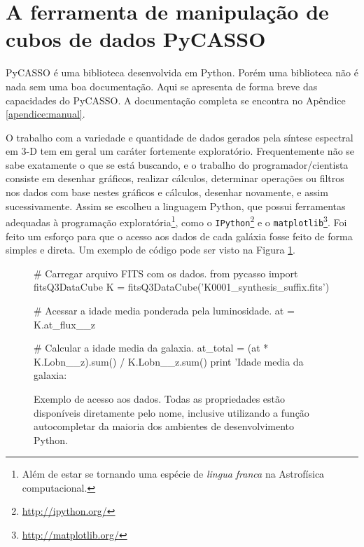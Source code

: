 
\section{A ferramenta de manipulação de cubos de dados PyCASSO}
\label{sec:pycasso:Pycasso}

PyCASSO é uma biblioteca desenvolvida em Python. Porém uma biblioteca não é nada
sem uma boa documentação. Aqui se apresenta de forma breve das capacidades do
PyCASSO. A documentação completa se encontra no Apêndice \ref{apendice:manual}.

O trabalho com a variedade e quantidade de dados gerados pela síntese espectral
em 3-D tem em geral um caráter fortemente exploratório. Frequentemente não se
sabe exatamente o que se está buscando, e o trabalho do programador/cientista
consiste em desenhar gráficos, realizar cálculos, determinar operações ou
filtros nos dados com base nestes gráficos e cálculos, desenhar novamente, e
assim sucessivamente. Assim se escolheu a linguagem Python, que possui
ferramentas adequadas à programação exploratória\footnote{Além de estar se
tornando uma espécie de {\em lingua franca} na Astrofísica computacional.}, como
o \texttt{IPython}\footnote{\url{http://ipython.org/}} e o
\texttt{matplotlib}\footnote{\url{http://matplotlib.org/}}. Foi feito um esforço
para que o acesso aos dados de cada galáxia fosse feito de forma simples e
direta. Um exemplo de código pode ser visto na Figura \ref{fig:dataAccess}.


\begin{figure}
\begin{python}
# Carregar arquivo FITS com os dados.
from pycasso import fitsQ3DataCube
K = fitsQ3DataCube('K0001_synthesis_suffix.fits')

# Acessar a idade media ponderada pela luminosidade.
at = K.at_flux__z

# Calcular a idade media da galaxia.
at_total = (at * K.Lobn__z).sum() / K.Lobn__z.sum()
print 'Idade media da galaxia: %
\end{python}
	\caption[Exemplo de programa utilizando PyCASSO]
	{Exemplo de acesso aos dados. Todas as propriedades estão disponíveis
	diretamente pelo nome, inclusive utilizando a função autocompletar da maioria
	dos ambientes de desenvolvimento Python.}
	\label{fig:dataAccess}
\end{figure}

